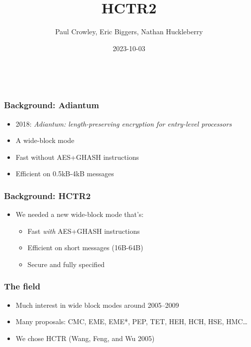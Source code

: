 \documentclass[aspectratio=169]{beamer}
\title{HCTR2}
\author{Paul Crowley, Eric Biggers, Nathan Huckleberry}
\institute{Google LLC}
\date{2023-10-03}
\newenvironment*{figslide}{
    \begin{columns}
        \begin{column}{.4\textwidth}

}{
\end{column}
\begin{column}{.6\textwidth}
    \begin{figure}
        
    \end{figure}
\end{column}
\end{columns}
}
\begin{document}
\begin{frame}
    \begin{figslide}
        \titlepage
    \end{figslide}
\end{frame}

\begin{frame}

\frametitle{Background: Adiantum}

\begin{itemize}
    \item 2018: \textit{Adiantum: length-preserving encryption for entry-level processors}
    \item A wide-block mode
    \item Fast without AES+GHASH instructions
    \item Efficient on 0.5kB-4kB messages
\end{itemize}
\end{frame}

\begin{frame}

    \frametitle{Background: HCTR2}
    
    \begin{itemize}
        \item We needed a new wide-block mode that's:
        \begin{itemize}
            \item Fast \textit{with} AES+GHASH instructions
            \item Efficient on short messages (16B-64B)
            \item Secure and fully specified
        \end{itemize}
    \end{itemize}
\end{frame}

\begin{frame}

\frametitle{The field}

\begin{itemize}
    \item Much interest in wide block modes around 2005--2009
    \item Many proposals: CMC, EME, EME*, PEP, TET, HEH, HCH, HSE, HMC\ldots
    \item We chose HCTR (Wang, Feng, and Wu 2005)
\end{itemize}
\end{frame}

\toggletrue{oldhctr}
\end{document}
